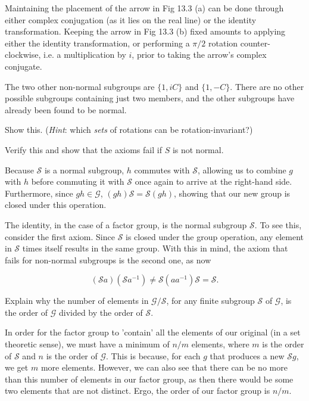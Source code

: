 \documentclass[../the-road-to-reality.tex]{subfiles}
\begin{document}
\begin{questions}
\begin{solution}
        Maintaining the placement of the arrow in Fig 13.3 (a) can be done through either complex conjugation (as it lies on the real line) or the identity transformation. Keeping the arrow in Fig 13.3 (b) fixed amounts to applying either the identity transformation, or performing a $\pi/2$ rotation counter-clockwise, i.e. a multiplication by $i$, prior to taking the arrow's complex conjugate.

        The two other non-normal subgroups are $\{1, iC\}$ and $\{1, -C\}$. There are no other possible subgroups containing just two members, and the other subgroups have already been found to be normal.
\end{solution}

\question Show this. (\textit{Hint}: which \textit{sets} of rotations can be rotation-invariant?)

\question Verify this and show that the axioms fail if $S$ is not normal.

\begin{solution}
        Because $\mathcal{S}$ is a normal subgroup, $h$ commutes with $\mathcal{S}$, allowing us to combine $g$ with $h$ before commuting it with $\mathcal{S}$ once again to arrive at the right-hand side. Furthermore, since $gh \in \mathcal{G}$, $(gh)\mathcal{S} = \mathcal{S}(gh)$, showing that our new group is closed under this operation.

        The identity, in the case of a factor group, is the normal subgroup $\mathcal{S}$. To see this, consider the first axiom. Since $\mathcal{S}$ is closed under the group operation, any element in $\mathcal{S}$ times itself results in the same group. With this in mind, the axiom that fails for non-normal subgroups is the second one, as now

	\[
        (\mathcal{S}a)(\mathcal{S}a^{-1}) \neq \mathcal{S}(aa^{-1})\mathcal{S} = \mathcal{S}
	.\] 
\end{solution}

\question Explain why the number of elements in $\mathcal{G}/\mathcal{S}$, for any finite subgroup $\mathcal{S}$ of $\mathcal{G}$, is the order of $\mathcal{G}$ divided by the order of $\mathcal{S}$.

\begin{solution}
        In order for the factor group to 'contain' all the elements of our original (in a set theoretic sense), we must have a minimum of $n/m$ elements, where $m$ is the order of $\mathcal{S}$ and $n$ is the order of $\mathcal{G}$. This is because, for each $g$ that produces a new $\mathcal{S}g$, we get $m$ more elements. However, we can also see that there can be no more than this number of elements in our factor group, as then there would be some two elements that are not distinct. Ergo, the order of our factor group is $n/m$.
\end{solution}


\end{questions}
\end{document}
